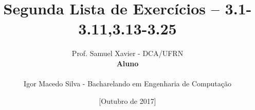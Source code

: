 
\title{Segunda Lista de Exercícios -- 3.1-3.11,3.13-3.25}

\author{
Prof. Samuel Xavier - DCA/UFRN\\

\textbf{Aluno}\\
\\
Igor Macedo Silva - Bacharelando em Engenharia de Computação \\
}

\date{[Outubro de 2017]}

\makeatletter
\def\@maketitle{
\begin{center}
   \texttt{[image: cover/imgs/ufrn.png]}\\
   \vfill
   {\large Universidade Federal do Rio Grande do Norte\\
   Departamento de Engenharia de Computacão e Automação}

   \vskip 4em
   {\Large Programação Concorrente e Distribuida}

   \vskip 4.5em
   {\normalsize\printwp}

   \vskip 5em
   {\LARGE\bfseries\@title}

   \vfill
   {\normalsize Natal-RN, Brasil\\\@date}
\end{center}

\newpage
{\noindent\Large\bfseries Professor}\smallskip\\
{\normalsize\@author}
}
\makeatother




\frenchspacing
\maketitle
\thispagestyle{empty}

\newpage
\tableofcontents
\thispagestyle{empty}

\newpage
\listoffigures
\thispagestyle{empty}

\newpage
\listoftables
\thispagestyle{empty}

